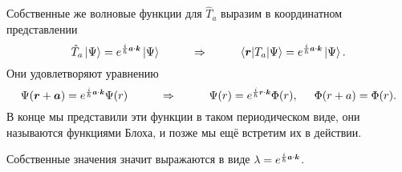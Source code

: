 Собственные же волновые функции для $\hat{T}_a$ выразим в координатном представлении
\begin{equation*}
	\hat{T}_a \ket{\Psi} = e^{\frac{i}{\hbar} \smallvc{a} \cdot \smallvc{k}} \ket{\Psi}
	\hspace{1 cm}
	\Rightarrow
	\hspace{1 cm}
	\bk{\vc{r}}[T_a]{\Psi} = e^{\frac{i}{\hbar} \smallvc{a} \cdot \smallvc{k}} \ket{\Psi}.
\end{equation*}
Они удовлетворяют уравнению
\begin{equation*}
	\Psi(\vc{r} + \vc{a}) = e^{\frac{i}{\hbar} \smallvc{a} \cdot \smallvc{k}} \Psi (r)
	\hspace{1 cm}
	\Rightarrow
	\hspace{1 cm}
	\Psi(r) = e^{\frac{i}{\hbar} \smallvc{r} \cdot \smallvc{k}} \Phi(r), 
	\hspace{0.5 cm}
	\Phi(r + a) = \Phi(r).
\end{equation*}
В конце мы представили эти функции в таком периодическом виде, они называются функциями Блоха, и позже мы ещё встретим их в действии.

Собственные значения значит выражаются в виде $\lambda = e^{\frac{i}{\hbar} \smallvc{a} \cdot \smallvc{k}}$.